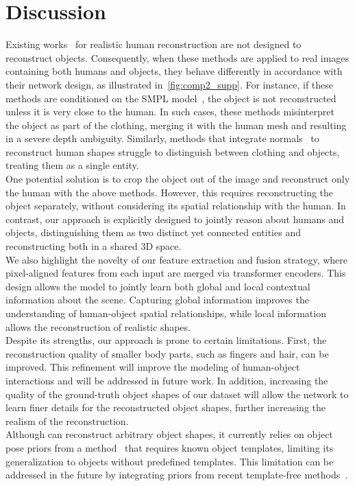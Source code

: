 \section{Discussion}
\label{sec:discussion}
Existing works~\cite{econ, ho2024sith, pifuhd} for realistic human reconstruction are not designed to reconstruct objects. Consequently, when these methods are applied to real images containing both humans and objects, they behave differently in accordance with their network design, as illustrated in~\cref{fig:comp2_supp}. For instance, if these methods are conditioned on the SMPL model~\cite{ho2024sith,econ}, the object is not reconstructed unless it is very  close to the human. In such cases, these methods misinterpret the object as part of the clothing, merging it with the human mesh and resulting in a severe depth ambiguity. Similarly, methods that integrate normals~\cite{pifuhd} to reconstruct human shapes struggle to distinguish between clothing and objects, treating them as a single entity.
\\One potential solution is to crop the object out of the image and reconstruct only the human with the above methods. However, this requires reconstructing the object separately, without considering its spatial relationship with the human. In contrast, our approach is explicitly designed to jointly reason about humans and objects, distinguishing them as two distinct yet connected entities and reconstructing both in a shared 3D space.
\\We also highlight the novelty of our feature extraction and fusion strategy, where pixel-aligned features from each input are merged via transformer encoders. This design allows the model to jointly learn both global and local contextual information about the scene. Capturing global information improves the understanding of human-object spatial relationships, while local information  allows the reconstruction of realistic shapes.
\\Despite its strengths, our approach is prone to certain limitations.  First, the reconstruction quality of smaller body parts, such as fingers and hair, can be improved. This refinement will improve the modeling of human-object interactions and will be addressed in future work. In addition, increasing the quality of the ground-truth object shapes of our dataset will allow the network to learn finer details for the reconstructed object shapes, further increasing the realism of the reconstruction.
\\
Although \name can reconstruct arbitrary object shapes, it currently relies on object pose priors from a method~\cite{xie2022chore} that requires known object templates, limiting its generalization to objects without predefined templates. This limitation can be addressed in the future by integrating priors from recent template-free methods~\cite{xie2023template_free}. 
